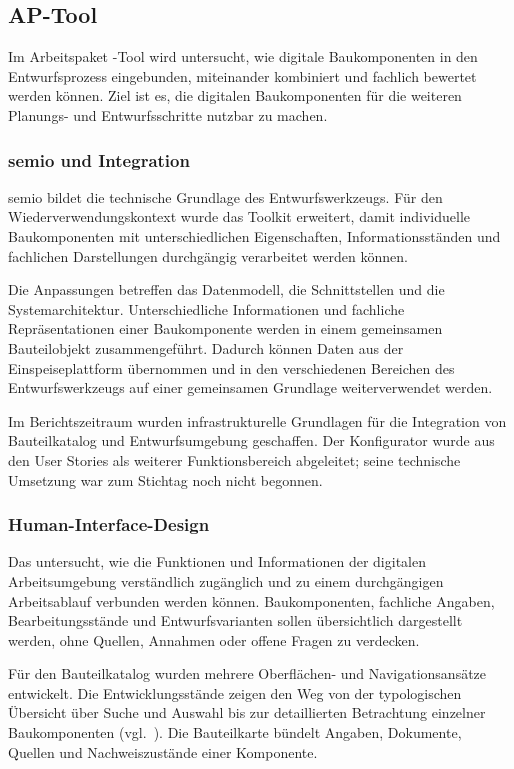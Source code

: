 \documentclass[type=zwischenbericht]{zukunftbau}
\begin{document}
\subsection{AP-Tool}

Im Arbeitspaket -Tool wird untersucht, wie digitale Baukomponenten in den Entwurfsprozess eingebunden, miteinander kombiniert und fachlich bewertet werden können. Ziel ist es, die digitalen Baukomponenten für die weiteren Planungs- und Entwurfsschritte nutzbar zu machen.

\subsubsection{semio und Integration}
semio bildet die technische Grundlage des Entwurfswerkzeugs. Für den Wiederverwendungskontext wurde das Toolkit erweitert, damit individuelle Baukomponenten mit unterschiedlichen Eigenschaften, Informationsständen und fachlichen Darstellungen durchgängig verarbeitet werden können.

Die Anpassungen betreffen das Datenmodell, die Schnittstellen und die Systemarchitektur. Unterschiedliche Informationen und fachliche Repräsentationen einer Baukomponente werden in einem gemeinsamen Bauteilobjekt zusammengeführt. Dadurch können Daten aus der Einspeiseplattform übernommen und in den verschiedenen Bereichen des Entwurfswerkzeugs auf einer gemeinsamen Grundlage weiterverwendet werden.

Im Berichtszeitraum wurden infrastrukturelle Grundlagen für die Integration von Bauteilkatalog und Entwurfsumgebung geschaffen. Der Konfigurator wurde aus den User Stories als weiterer Funktionsbereich abgeleitet; seine technische Umsetzung war zum Stichtag noch nicht begonnen.

\subsubsection{Human-Interface-Design}
\label{abschnitt:human-interface-design}
Das  untersucht, wie die Funktionen und Informationen der digitalen Arbeitsumgebung verständlich zugänglich und zu einem durchgängigen Arbeitsablauf verbunden werden können. Baukomponenten, fachliche Angaben, Bearbeitungsstände und Entwurfsvarianten sollen übersichtlich dargestellt werden, ohne Quellen, Annahmen oder offene Fragen zu verdecken.

Für den Bauteilkatalog wurden mehrere Oberflächen- und Navigationsansätze entwickelt. Die Entwicklungsstände zeigen den Weg von der typologischen Übersicht über Suche und Auswahl bis zur detaillierten Betrachtung einzelner Baukomponenten (vgl.\ ). Die Bauteilkarte bündelt Angaben, Dokumente, Quellen und Nachweiszustände einer Komponente.
\end{document}
